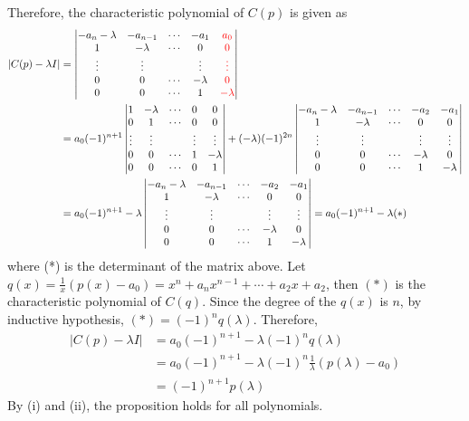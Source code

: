 Therefore, the characteristic polynomial of $C(p)$ is given as \begin{align*}
	\vert C(p) - \lambda I \vert &= \begin{vmatrix}
		-a_n-\lambda & -a_{n-1} & \cdots & -a_1 & {\color{red}a_0} \\
		1 & -\lambda & \cdots & 0 & {\color{red}0} \\
		\vdots & \vdots & & \vdots & {\color{red}\vdots} \\
		0 & 0 & \cdots & -\lambda & {\color{red}0} \\
		0 & 0 & \cdots & 1 & {\color{red}-\lambda}
	\end{vmatrix} \\
	&= a_0(-1)^{n+1}\begin{vmatrix}
		1 & -\lambda & \cdots & 0 & 0 \\
		0 & 1        & \cdots & 0 & 0 \\
		\vdots & \vdots & & \vdots & \vdots \\
		0 & 0 & \cdots & 1 & -\lambda \\
		0 & 0 & \cdots & 0 & 1
	\end{vmatrix} + (-\lambda)(-1)^{2n}\begin{vmatrix}
		-a_n-\lambda & -a_{n-1} & \cdots & -a_2 & -a_1 \\
		1 & -\lambda & \cdots & 0 & 0 \\
		\vdots & \vdots & & \vdots & \vdots \\
		0 & 0 & \cdots & -\lambda & 0 \\
		0 & 0 & \cdots & 1 & -\lambda
	\end{vmatrix} \\
	&= a_0(-1)^{n+1} -\lambda\begin{vmatrix}
	-a_n-\lambda & -a_{n-1} & \cdots & -a_2 & -a_1 \\
	1 & -\lambda & \cdots & 0 & 0 \\
	\vdots & \vdots & & \vdots & \vdots \\
	0 & 0 & \cdots & -\lambda & 0 \\
	0 & 0 & \cdots & 1 & -\lambda
	\end{vmatrix} = a_0(-1)^{n+1} - \lambda(*)
\end{align*} where (*) is the determinant of the matrix above.
Let $q(x) = \frac{1}{x}(p(x) - a_0) = x^n + a_nx^{n-1} + \cdots + a_2x + a_2$, then $(*)$ is the characteristic polynomial of $C(q)$. Since the degree of the $q(x)$ is $n$, by inductive hypothesis, $(*) = (-1)^nq(\lambda)$. Therefore, \begin{align*}
	\vert C(p) - \lambda I \vert &= a_0(-1)^{n+1} - \lambda (-1)^n q(\lambda) \\
	&= a_0(-1)^{n+1} - \lambda (-1)^n \frac{1}{\lambda}(p(\lambda) - a_0) \\
	&= (-1)^{n+1}p(\lambda)
\end{align*}
By (i) and (ii), the proposition holds for all polynomials. \\

